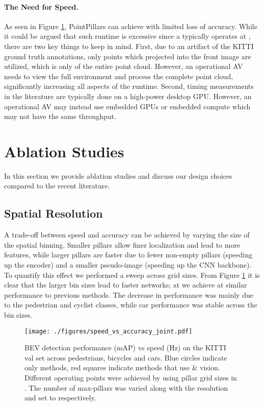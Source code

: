 \documentclass[10pt,twocolumn,letterpaper]{article}
\newcommand{\mypar}[1]{\vspace{-4mm}\paragraph{#1}}
\newcommand{\figref}[1]{Figure \ref{#1}}
\newcommand{\squeeze}{\vspace{-0.5mm}}
\begin{document}
\mypar{The Need for Speed.}
As seen in \figref{fig:speed_accuracy_val}, PointPillars can achieve \maxhertz with limited loss of accuracy.
While it could be argued that such runtime is excessive since a \lidar typically operates at , there are two key things to keep in mind.
First, due to an artifact of the KITTI ground truth annotations, only \lidar points which projected into the front image are utilized, which is only  of the entire point cloud. However, an operational AV needs to view the full environment and process the complete point cloud, significantly increasing all aspects of the runtime.
Second, timing measurements in the literature are typically done on a high-power desktop GPU. However, an operational AV may instead use embedded GPUs or embedded compute which may not have the same throughput.
 


\section{Ablation Studies} \label{sec:exp}
\squeeze
In this section we provide ablation studies and discuss our design choices compared to the recent literature.

\squeeze
\subsection{Spatial Resolution}
\squeeze
A trade-off between speed and accuracy can be achieved by varying the size of the spatial binning.
Smaller pillars allow finer localization and lead to more features, while larger pillars are faster due to fewer non-empty pillars (speeding up the encoder) and a smaller pseudo-image (speeding up the CNN backbone).
To quantify this effect we performed a sweep across grid sizes.
From \figref{fig:speed_accuracy_val} it is clear that the larger bin sizes lead to faster networks; at  we achieve \maxhertz at similar performance to previous methods.
The decrease in performance was mainly due to the pedestrian and cyclist classes, while car performance was stable across the bin sizes.

\begin{figure}
\begin{center}
\texttt{[image: ./figures/speed\_vs\_accuracy\_joint.pdf]}
\end{center}
\vspace{-3mm}
\caption{BEV detection performance (mAP) vs speed (Hz) on the KITTI~\cite{kitti} val set across pedestrians, bicycles and cars.
Blue circles indicate \lidar only methods, red squares indicate methods that use \lidar \& vision.
Different operating points were achieved by using pillar grid sizes in  . The number of max-pillars was varied along with the resolution and set to  respectively.
}
\label{fig:speed_accuracy_val}
\end{figure}
\end{document}
